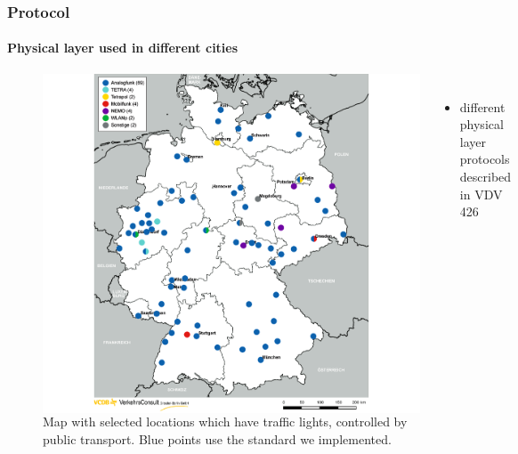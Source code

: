 \begin{frame}
\frametitle{Protocol}
\framesubtitle{Physical layer used in different cities}
\begin{figure}
\begin{columns}
\centering
\includegraphics[height=0.8\textheight]{figs/vcdb-map-ampelbeeinflussung.png}
\caption{Map with selected locations which have traffic lights, controlled by public transport. Blue points use the standard we implemented.}
\vspace{0.5cm}
\begin{itemize}
	\item different physical layer protocols described in VDV 426
\end{itemize}
\end{columns}
\end{figure}
\end{frame}

